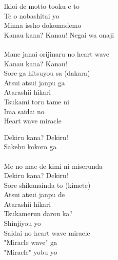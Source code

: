 \begin{multicols}{2}
Ikioi de motto tooku e to\\
Te o nobashitai yo\\
Minna issho dokomademo\\

Kanau kana?  Kanau! 
Negai wa onaji\\
\\
Mane janai orijinaru no heart wave\\
Kanau kana?  Kanau! \\
Sore ga hitsuyou sa (dakara)\\
Atsui atsui janpu ga\\
Atarashii hikari\\
Tsukami toru tame ni\\
Ima saidai no \\
Heart wave miracle\\


Dekiru kana?  Dekiru! \\
Sakebu kokoro ga\\
\\
Me no mae de kimi ni miserunda\\
Dekiru kana?  Dekiru! \\
Sore shikanainda to (kimete)\\
Atsui atsui janpu de\\
Atarashii hikari\\
Tsukamerun darou ka?\\
Shinjiyou yo \\
Saidai no heart wave miracle\\
"Miracle wave" ga\\
"Miracle" yobu yo\\
\end{multicols}

\ifdefined\COMPLETE
\else
	
\fi
